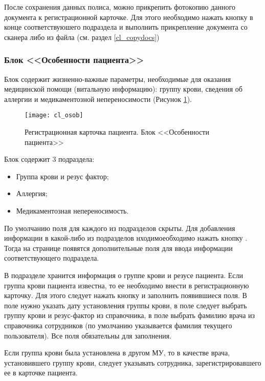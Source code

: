 {После сохранения данных полиса, можно прикрепить фотокопию данного документа к регистрационной карточке. Для этого необходимо нажать кнопку  в конце соответствуюшего подраздела и выполнить прикрепление документа со сканера либо из файла (см. раздел \ref{cl_copydocs})


\subsubsection{Блок <<Особенности пациента>>} 

Блок  содержит жизненно-важные параметры, необходимые для оказания медицинской помощи (витальную информацию): группу крови, сведения об аллергии и медикаментозной непереносимости (Рисунок \ref{img_cl_osob}). 

\begin{figure}[!ht]\centering
 \texttt{[image: cl\_osob]}
 \caption{Регистрационная карточка пациента. Блок <<Особенности пациента>>}
 \label{img_cl_osob}
\end{figure} 

Блок содержит 3 подраздела: 
\begin{itemize}
 \item Группа крови и резус фактор;
 \item Аллергия;
 \item Медикаментозная непереносимость.
\end{itemize}

По умолчанию поля для каждого из подразделов скрыты. Для добавления информации в какой-либо из подразделов нходимоеобходимо нажать кнопку . Тогда на странице появятся дополнительные поля для ввода информации соответствующего подраздела.

В подразделе  хранится информация о группе крови  и резусе пациента. Если группа крови пациента известна, то ее необходимо внести в регистрационную карточку. Для этого следует нажать кнопку  и заполнить появившиеся поля. В поле  нужно указать дату установления группы крови, в поле  следует выбрать группу крови и резус-фактор из справочника, в поле  выбрать фамилию врача из справочника сотрудников (по умолчанию указывается фамилия текущего пользователя). Все поля обязательны для заполнения. 

Если группа крови была установлена в другом МУ, то в качестве врача, установившего группу крови, следует указывать сотрудника, зарегистрировавшего ее в карточке пациента.

}
